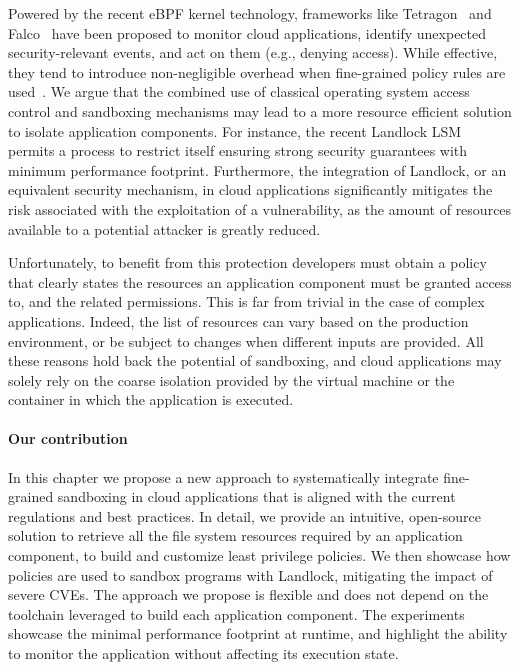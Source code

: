 Powered by the recent eBPF kernel technology, frameworks like
Tetragon~\cite{tetragon} and Falco~\cite{falco} have been proposed to
monitor cloud applications, identify unexpected security-relevant
events, and act on them (e.g., denying access). While effective, they
tend to introduce non-negligible overhead when fine-grained policy
rules are used~\cite{falco-overhead}.  We argue that the combined use
of classical operating system access control and sandboxing mechanisms
may lead to a more resource efficient solution to isolate application
components.  For instance, the recent Landlock LSM~\cite{landlock}
permits a process to restrict itself ensuring strong security
guarantees with minimum performance footprint.  Furthermore, the
integration of Landlock, or an equivalent security mechanism, in cloud
applications significantly mitigates the risk associated with the
exploitation of a vulnerability, as the amount of resources available
to a potential attacker is greatly reduced.

Unfortunately, to benefit from this protection developers must obtain
a policy that clearly states the resources an application component
must be granted access to, and the related permissions. This is far
from trivial in the case of complex applications. Indeed, the list of
resources can vary based on the production environment, or be subject
to changes when different inputs are provided. All these reasons hold
back the potential of sandboxing, and cloud applications may solely
rely on the coarse isolation provided by the virtual machine or the
container in which the application is executed.

\paragraph*{Our contribution}
In this chapter we propose a new approach to systematically integrate
fine-grained sandboxing in cloud applications that is aligned with the
current regulations and best practices. In detail, we provide an
intuitive, open-source solution to retrieve all the file system
resources required by an application component, to build and customize
least privilege policies. We then showcase how policies are used to
sandbox programs with Landlock, mitigating the impact of severe
CVEs. The approach we propose is flexible and does not depend on the
toolchain leveraged to build each application component. The
experiments showcase the minimal performance footprint at runtime, and
highlight the ability to monitor the application without affecting its
execution state.

